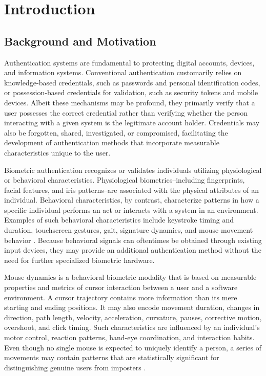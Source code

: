 \documentclass[conference]{IEEEtran}
\begin{document}
\section{Introduction}
\subsection{Background and Motivation}
Authentication systems are fundamental to protecting digital accounts, devices, and information systems. Conventional authentication customarily relies on knowledge-based credentials, such as passwords and personal identification codes, or possession-based credentials for validation, such as security tokens and mobile devices. Albeit these mechanisms may be profound, they primarily verify that a user possesses the correct credential rather than verifying whether the person interacting with a given system is the legitimate account holder. Credentials may also be forgotten, shared, investigated, or compromised, facilitating the development of authentication methods that incorporate measurable characteristics unique to the user. 

Biometric authentication recognizes or validates individuals utilizing physiological or behavioral characteristics. Physiological biometrics--including fingerprints, facial features, and iris patterns--are associated with the physical attributes of an individual. Behavioral characteristics, by contrast, characterize patterns in how a specific individual performs an act or interacts with a system in an environment. Examples of such behavioral characteristics include keystroke timing and duration, touchscreen gestures, gait, signature dynamics, and mouse movement behavior \cite{nistBiometrics,khanMouseSurvey}. Because behavioral signals can oftentimes be obtained through existing input devices, they may provide an additional authentication method without the need for further specialized biometric hardware. 

Mouse dynamics is a behavioral biometric modality that is based on measurable properties and metrics of cursor interaction between a user and a software environment. A cursor trajectory contains more information than its mere starting and ending positions. It may also encode movement duration, changes in direction, path length, velocity, acceleration, curvature, pauses, corrective motion, overshoot, and click timing. Such characteristics are influenced by an individual's motor control, reaction patterns, hand-eye coordination, and interaction habits. Even though no single mouse is expected to uniquely identify a person, a series of movements may contain patterns that are statistically significant for distinguishing genuine users from imposters \cite{khanMouseSurvey,deutschmannContinuousAuthentication}.
\end{document}
